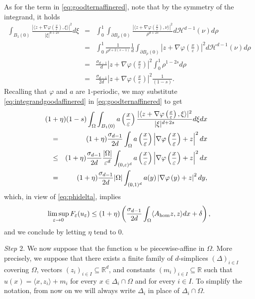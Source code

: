 \documentclass[11pt,a4paper,reqno]{amsart}
\theoremstyle{plain}
\theoremstyle{definition}
\newcommand\e{\varepsilon}
\newcommand\Rd{\mathbb{R}^d}
\newcommand\Om{\Omega}
\newcommand\be{\begin{equation}}
\newcommand\ee{\end{equation}}
\newcommand\Hd[1]{\mathcal{H}^{d-1}(#1)}
\theoremstyle{remark}
\begin{document}
As for the term in  \eqref{eq:goodternaffinered}, note that by the symmetry of the integrand, it holds
\begin{eqnarray}\nonumber 
\int_{B_1(0)}\frac{| \langle z + \nabla{\varphi}\left(\frac{x}{\e}\right), \xi\rangle |^2}{\lvert \xi\rvert^{d+2s}}d\xi &=& \int_0^1 \int_{\partial B_\rho(0)} \frac{\left|\langle z+\nabla\varphi\left(\frac{x}{\e}\right) , \nu \rangle\right|^2} {\rho^{d+2s}} d\Hd\nu d\rho \\ \nonumber
&=& \int_0^1 \frac{1}{\rho^{d+2(s-1)}}\frac{1}{d}\int_{\partial B_\rho(0)} \left|z+\nabla\varphi\left(\frac{x}{\e}\right)\right|^2 d\Hd\nu d\rho \\ \nonumber
&=& \frac{\sigma_{d-1}}{d}\left|z+\nabla\varphi\left(\frac{x}{\e}\right)\right|^2 \int_0^1 \rho^{1-2s}d\rho \\ \label{eq:integrandgoodaffinered}
&=& \frac{\sigma_{d-1}}{2d}\left|z+\nabla\varphi\left(\frac{x}{\e}\right)\right|^2 \frac{1}{(1-s)}.
\end{eqnarray}
 Recalling that $\varphi$ and $a$ are $1$-periodic, we may substitute \eqref{eq:integrandgoodaffinered} in \eqref{eq:goodternaffinered} to get
\begin{eqnarray}\nonumber 
&& \hskip-3cm (1+\eta)(1-s)\int_\Omega \int_{B_1(0)} a\left(\frac{x}{\e}\right)\frac{|\langle z + \nabla\varphi \left(\frac{x}{\e}\right), \xi \rangle|^2}{|\xi|^{d+2s}} d\xi dx 
\\ \nonumber
&=&(1+\eta)\frac{\sigma_{d-1}}{2d}\int_\Omega a\left(\frac{x}{\e}\right)\left\lvert\nabla{\varphi}\left(\frac{x}{\e}\right)+z\right\rvert^2dx \\ \nonumber
&\leq& (1+\eta)\frac{\sigma_{d-1}}{2d}\frac{|\Om|}{\e^d}\int_{(0,\e)^d}a\left(\frac{x}{\e}\right)\left|\nabla\varphi\left(\frac{x}{\e}\right)+z\right|^2dx\\ \label{estimateperiod}
&=& (1+\eta)\frac{\sigma_{d-1}}{2d}\lvert\Om\rvert\int_{(0,1)^d} a(y)\left\lvert\nabla{\varphi}\left(y\right)+z\right\rvert^2dy,
\end{eqnarray}
which, in view of \eqref{eq:phidelta}, implies
\be\nonumber
\limsup_{\e\to 0}F_\e(u_\e)\leq(1+\eta)\left(\frac{\sigma_{d-1}}{2d}\int_\Omega\langle A_{\rm hom}z,z\rangle dx+\delta\right),
\ee
 and we conclude by letting $\eta$ tend to $0$.

\bigskip

\textit{Step $2$}. We now suppose that the function $u$ be piecewise-affine in $\Om$. More precisely, we suppose that there exists a finite family of $d$-simplices $(\Delta)_{i\in I}$ covering $\Omega$, vectors $(z_i)_{i\in I}\subseteq \Rd$, and constants $(m_i)_{i\in I}\subseteq \mathbb{R}$ such that $u(x)=\langle x,z_i\rangle+m_i$ for every $x\in \Delta_i\cap\Om$ and for every $i\in I$. To simplify the notation, from now on we will always write $\Delta_i$ in place of $\Delta_i\cap\Omega$.
\end{document}
